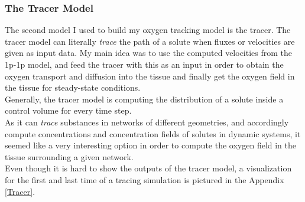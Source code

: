 %

\subsubsection*{The Tracer Model}

The second model I used to build my oxygen tracking model is the tracer. The tracer model can literally \emph{trace} the path of a solute when fluxes or velocities are given as input data. My main idea was to use the computed velocities from the 1p-1p model, and feed the tracer with this as an input in order to obtain the oxygen transport and diffusion into the tissue and finally get the oxygen field in the tissue for steady-state conditions.
\\Generally, the tracer model is computing the distribution of a solute inside a control volume for every time step.
\\As it can \emph{trace} substances in networks of different geometries, and accordingly compute concentrations and concentration fields of solutes in dynamic systems, it seemed like a very interesting option in order to compute the oxygen field in the tissue surrounding a given network.
\\Even though it is hard to show the outputs of the tracer model, a visualization for the first and last time of a tracing simulation is pictured in the Appendix \ref{Tracer}.\\

